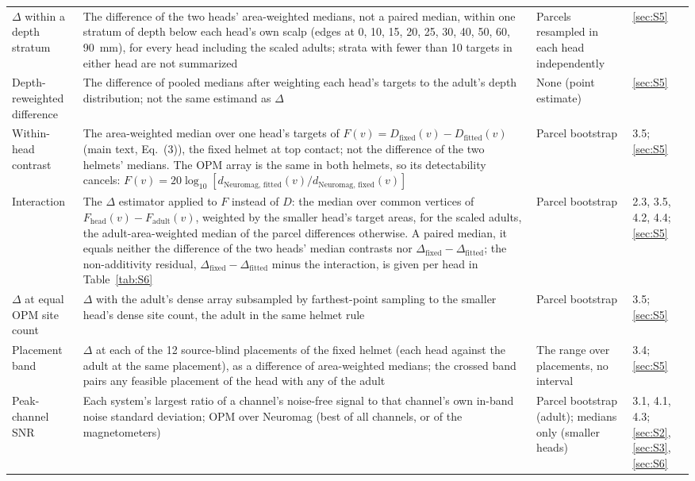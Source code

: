 \documentclass[preprint,12pt,authoryear,a4paper]{elsarticle}
\begin{document}
{\begin{longtable}{@{}L{2.2cm}L{8.0cm}L{3.4cm}L{1.6cm}@{}}
$\Delta$ within a depth stratum & The difference of the two heads' area-weighted medians, not a paired median, within one stratum of depth below each head's own scalp (edges at 0, 10, 15, 20, 25, 30, 40, 50, 60, 90~mm), for every head including the scaled adults; strata with fewer than 10 targets in either head are not summarized & Parcels resampled in each head independently & \ref{sec:S5} \\
Depth-reweighted difference & The difference of pooled medians after weighting each head's targets to the adult's depth distribution; not the same estimand as $\Delta$ & None (point estimate) & \ref{sec:S5} \\
Within-head contrast & The area-weighted median over one head's targets of $F(v) = D_{\mathrm{fixed}}(v) - D_{\mathrm{fitted}}(v)$ (main text, Eq.~(3)), the fixed helmet at top contact; not the difference of the two helmets' medians. The OPM array is the same in both helmets, so its detectability cancels: $F(v) = 20\log_{10}[d_{\mathrm{Neuromag,\,fitted}}(v)/d_{\mathrm{Neuromag,\,fixed}}(v)]$ & Parcel bootstrap & 3.5; \ref{sec:S5} \\
Interaction & The $\Delta$ estimator applied to $F$ instead of $D$: the median over common vertices of $F_{\mathrm{head}}(v) - F_{\mathrm{adult}}(v)$, weighted by the smaller head's target areas, for the scaled adults, the adult-area-weighted median of the parcel differences otherwise. A paired median, it equals neither the difference of the two heads' median contrasts nor $\Delta_{\mathrm{fixed}} - \Delta_{\mathrm{fitted}}$; the non-additivity residual, $\Delta_{\mathrm{fixed}} - \Delta_{\mathrm{fitted}}$ minus the interaction, is given per head in Table~\ref{tab:S6} & Parcel bootstrap & 2.3, 3.5, 4.2, 4.4; \ref{sec:S5} \\
$\Delta$ at equal OPM site count & $\Delta$ with the adult's dense array subsampled by farthest-point sampling to the smaller head's dense site count, the adult in the same helmet rule & Parcel bootstrap & 3.5; \ref{sec:S5} \\
Placement band & $\Delta$ at each of the 12 source-blind placements of the fixed helmet (each head against the adult at the same placement), as a difference of area-weighted medians; the crossed band pairs any feasible placement of the head with any of the adult & The range over placements, no interval & 3.4; \ref{sec:S5} \\
Peak-channel SNR & Each system's largest ratio of a channel's noise-free signal to that channel's own in-band noise standard deviation; OPM over Neuromag (best of all channels, or of the magnetometers) & Parcel bootstrap (adult); medians only (smaller heads) & 3.1, 4.1, 4.3; \ref{sec:S2}, \ref{sec:S3}, \ref{sec:S6} \\

\end{longtable}}
\end{document}
